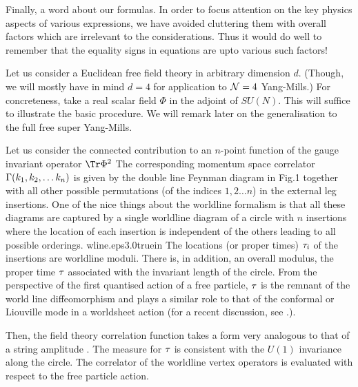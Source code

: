 Finally, a word about our formulas. In order to focus attention on the key physics aspects of 
various expressions, we have avoided cluttering them with overall
factors which are irrelevant to the considerations. 
Thus it would do well to remember that
the equality signs in equations are upto various such factors!


Let us consider a Euclidean free field theory in arbitrary
dimension $d$. (Though, we will mostly have in mind $d=4$ for application to ${\cal N}=4$ Yang-Mills.) 
For concreteness, take a real scalar field $\Phi$
in the adjoint of $SU(N)$. This will suffice to illustrate the basic procedure. We will 
remark later on the generalisation to the full free super Yang-Mills. 

Let us consider the connected contribution to an $n$-point function of the gauge invariant 
operator $\Tr\Phi^2$
\eqn{}
The corresponding momentum space correlator 
${\Gamma}(k_1, k_2,\ldots k_n)$ is given by the 
double line Feynman diagram in Fig.1 together with all other
possible permutations (of the indices $1,2\ldots n$) in the external leg insertions. 
One of the nice things about the worldline formalism is that all these diagrams are 
captured by a single worldline diagram of a circle with $n$ insertions where 
the location of each insertion is independent of the others leading to all 
possible orderings. 
%
{wline.eps}{3.0truein}
%
The locations (or proper times)
${\tau}_i$ of the insertions are worldline moduli. There is, in addition,
an overall modulus, the proper time ${\tau}$ associated
with the invariant length of the circle. From the perspective of the first quantised action
of a free particle, 
${\tau}$ is the remnant of the world line diffeomorphism and plays a similar role 
to that of the conformal or Liouville mode in a worldsheet action (for a recent discussion, see 
\ssen .).

Then, the field theory correlation function takes a form very analogous to that 
of a string amplitude \polbk\strass .
\eqn{}
The measure for ${\tau}$ is consistent with the $U(1)$ invariance along the circle.
The correlator of the worldline vertex operators is evaluated with respect to 
the free particle action.
\eqn{}

